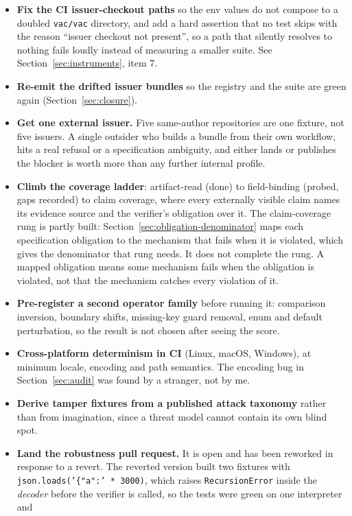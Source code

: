 \documentclass[11pt]{article}
\begin{document}
\begin{itemize}
\item \textbf{Fix the CI issuer-checkout paths} so the env values do not compose to a doubled
\texttt{vac/vac} directory, and add a hard assertion that no test skips with the reason
``issuer checkout not present'', so a path that silently resolves to nothing fails loudly
instead of measuring a smaller suite. See Section~\ref{sec:instruments}, item 7.
\item \textbf{Re-emit the drifted issuer bundles} so the registry and the suite are green
again (Section~\ref{sec:closure}).
\item \textbf{Get one external issuer.} Five same-author repositories are one fixture, not
five issuers. A single outsider who builds a bundle from their own workflow, hits a real
refusal or a specification ambiguity, and either lands or publishes the blocker is worth more
than any further internal profile.
\item \textbf{Climb the coverage ladder}: artifact-read (done) to field-binding (probed, gaps
recorded) to claim coverage, where every externally visible claim names its evidence source and
the verifier's obligation over it. The claim-coverage rung is partly built:
Section~\ref{sec:obligation-denominator} maps each specification obligation to the mechanism
that fails when it is violated, which gives the denominator that rung needs. It does not
complete the rung. A mapped obligation means some mechanism fails when the obligation is
violated, not that the mechanism catches every violation of it.
\item \textbf{Pre-register a second operator family} before running it: comparison inversion,
boundary shifts, missing-key guard removal, enum and default perturbation, so the result is not
chosen after seeing the score.
\item \textbf{Cross-platform determinism in CI} (Linux, macOS, Windows), at minimum locale,
encoding and path semantics. The encoding bug in Section~\ref{sec:audit} was found by a
stranger, not by me.
\item \textbf{Derive tamper fixtures from a published attack taxonomy}
\citep{ladisa2023sok} rather than from imagination, since a threat model cannot contain its
own blind spot.
\item \textbf{Land the robustness pull request.} It is open and has been reworked in response
to a revert. The reverted version built two fixtures with
\texttt{json.loads('\{"a":' * 3000)}, which raises \texttt{RecursionError} inside the
\emph{decoder} before the verifier is called, so the tests were green on one interpreter and

\end{itemize}
\end{document}
